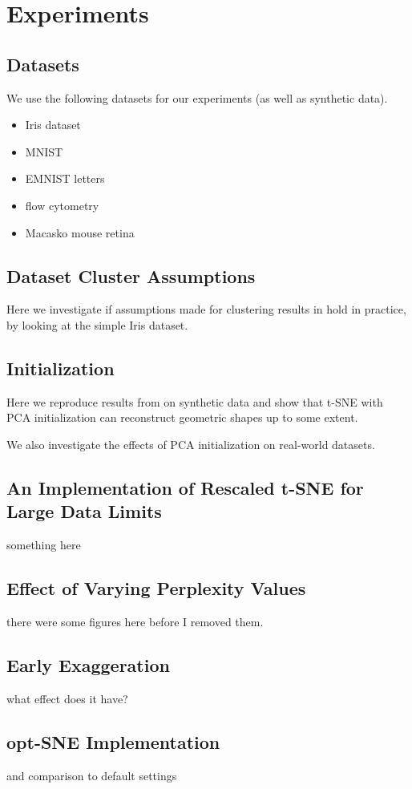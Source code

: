 \chapter{Experiments}\label{chapter:experiments}

\section{Datasets}
We use the following datasets for our experiments (as well as synthetic data). 
\begin{itemize}
    \item Iris dataset \cite{iris_dataset}
    \item MNIST \cite{mnist_dataset}
    \item EMNIST letters \cite{emnist_dataset}
    \item flow cytometry \cite{flow_dataset}
    \item Macasko mouse retina \cite{Macosko_dataset} 
\end{itemize}

\section{Dataset Cluster Assumptions}
Here we investigate if assumptions made for clustering results in \cite{LinStei22} hold in practice, by looking at the simple Iris dataset. 

\section{Initialization}
Here we reproduce results from \cite{kobak21} on synthetic data and show that t-SNE with PCA initialization can reconstruct geometric shapes up to some extent. 

We also investigate the effects of PCA initialization on real-world datasets. 

\section{An Implementation of Rescaled t-SNE for Large Data Limits}
something here 

\section{Effect of Varying Perplexity Values}
there were some figures here before I removed them. 

\section{Early Exaggeration}
what effect does it have? 

\section{opt-SNE Implementation}
and comparison to default settings 